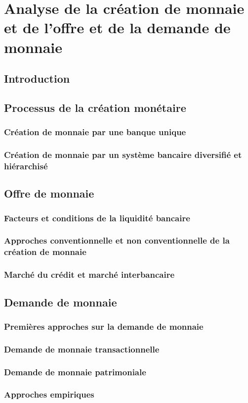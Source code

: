 \documentclass[a4paper, 12pt]{report}
\begin{document}
	
\chapter{Analyse de la création de	monnaie et de l'offre et de la demande de monnaie}
	
\section*{Introduction}

\section{Processus de la création monétaire}
	
\subsection{Création de monnaie par une banque unique}
	
\subsection{Création de monnaie par un système bancaire diversifié et hiérarchisé}
	
\section{Offre de monnaie}

\subsection{Facteurs et conditions de la liquidité bancaire}

\subsection{Approches conventionnelle et non conventionnelle de la création de monnaie}
	
\subsection{Marché du crédit et marché interbancaire}
	
\section{Demande de monnaie}	
	
\subsection{Premières approches sur la demande de monnaie}
	
\subsection{Demande de monnaie transactionnelle}
	
\subsection{Demande de monnaie patrimoniale}
	
\subsection{Approches empiriques}
	
	
	
	
	
\end{document}
